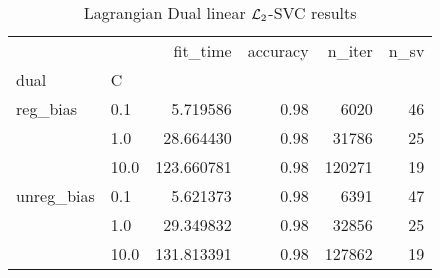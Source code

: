 \begin{table}[H]
\centering
\caption{Lagrangian Dual linear $\protect \mathcal{L}_2$-SVC results}
\label{linear_lagrangian_dual_l2_svc_cv_results}
\begin{tabular}{llrrrr}
\toprule
           &      &    fit\_time &  accuracy &  n\_iter &  n\_sv \\
dual & C &             &           &         &       \\
\midrule
reg\_bias & 0.1  &    5.719586 &      0.98 &    6020 &    46 \\
           & 1.0  &   28.664430 &      0.98 &   31786 &    25 \\
           & 10.0 &  123.660781 &      0.98 &  120271 &    19 \\
unreg\_bias & 0.1  &    5.621373 &      0.98 &    6391 &    47 \\
           & 1.0  &   29.349832 &      0.98 &   32856 &    25 \\
           & 10.0 &  131.813391 &      0.98 &  127862 &    19 \\
\bottomrule
\end{tabular}
\end{table}
